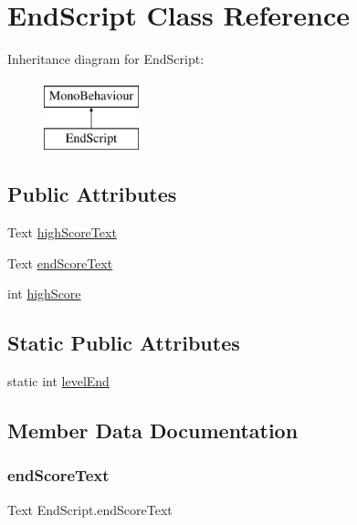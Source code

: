 \hypertarget{classEndScript}{}\section{End\+Script Class Reference}
\label{classEndScript}
Inheritance diagram for End\+Script\+:\begin{figure}[H]
\begin{center}
\leavevmode
\includegraphics[height=2.000000cm]{classEndScript}
\end{center}
\end{figure}
\subsection*{Public Attributes}
\begin{DoxyCompactItemize}
\item 
Text \hyperlink{classEndScript_a456ea5ed341311ea55ebc6ea7560a1bc}{high\+Score\+Text}
\item 
Text \hyperlink{classEndScript_ad9b9f96e897dab8bd78f711c1364b521}{end\+Score\+Text}
\item 
int \hyperlink{classEndScript_a5f0a88d9be022990d05c377228616da1}{high\+Score}
\end{DoxyCompactItemize}
\subsection*{Static Public Attributes}
\begin{DoxyCompactItemize}
\item 
static int \hyperlink{classEndScript_aba5d706ac8abdb526399c1cca351a991}{level\+End}
\end{DoxyCompactItemize}


\subsection{Member Data Documentation}
\mbox{\label{classEndScript_ad9b9f96e897dab8bd78f711c1364b521}} 
\subsubsection{\texorpdfstring{end\+Score\+Text}{endScoreText}}
{\footnotesize\ttfamily Text End\+Script.\+end\+Score\+Text}

